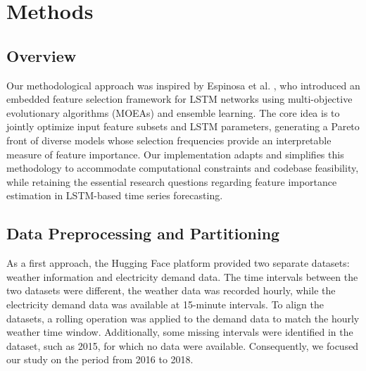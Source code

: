 \documentclass[12pt]{article}
\begin{document}
 
\section{Methods}
\label{sec:methods}

\subsection{Overview}

Our methodological approach was inspired by Espinosa et al. \cite{espinosa2023embeddedfeatureselectionlstm}, who introduced an embedded feature selection framework for LSTM networks using multi-objective evolutionary algorithms (MOEAs) and ensemble learning. The core idea is to jointly optimize input feature subsets and LSTM parameters, generating a Pareto front of diverse models whose selection frequencies provide an interpretable measure of feature importance. Our implementation adapts and simplifies this methodology to accommodate computational constraints and codebase feasibility, while retaining the essential research questions regarding feature importance estimation in LSTM-based time series forecasting.

\subsection{Data Preprocessing and Partitioning}

As a first approach, the Hugging Face platform provided two separate datasets: weather information and electricity demand data. The time intervals between the two datasets were different, the weather data was recorded hourly, while the electricity demand data was available at 15-minute intervals. To align the datasets, a rolling operation was applied to the demand data to match the hourly weather time window. Additionally, some missing intervals were identified in the dataset, such as 2015, for which no data were available. Consequently, we focused our study on the period from 2016 to 2018.
\end{document}
